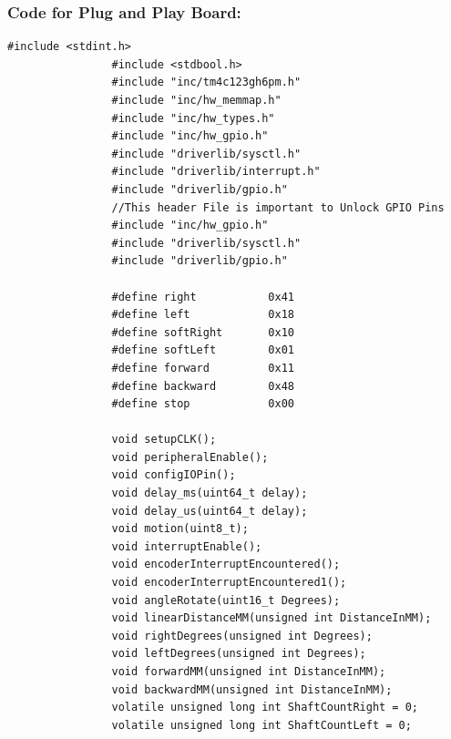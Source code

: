 \documentclass[a4paper,10pt,oneside]{article}
\begin{document}
			\subsubsection{\textbf{Code for Plug and Play Board:}}
			\begin{lstlisting}[style=CStyle]
				#include <stdint.h>
				#include <stdbool.h>
				#include "inc/tm4c123gh6pm.h"
				#include "inc/hw_memmap.h"
				#include "inc/hw_types.h"
				#include "inc/hw_gpio.h"
				#include "driverlib/sysctl.h"
				#include "driverlib/interrupt.h"
				#include "driverlib/gpio.h"
				//This header File is important to Unlock GPIO Pins
				#include "inc/hw_gpio.h"
				#include "driverlib/sysctl.h"
				#include "driverlib/gpio.h"
				
				#define right           0x41
				#define left            0x18
				#define softRight       0x10
				#define softLeft        0x01
				#define forward         0x11
				#define backward        0x48
				#define stop            0x00
				
				void setupCLK();
				void peripheralEnable();
				void configIOPin();
				void delay_ms(uint64_t delay);
				void delay_us(uint64_t delay);
				void motion(uint8_t);
				void interruptEnable();
				void encoderInterruptEncountered();
				void encoderInterruptEncountered1();
				void angleRotate(uint16_t Degrees);
				void linearDistanceMM(unsigned int DistanceInMM);
				void rightDegrees(unsigned int Degrees);
				void leftDegrees(unsigned int Degrees);
				void forwardMM(unsigned int DistanceInMM);
				void backwardMM(unsigned int DistanceInMM);
				volatile unsigned long int ShaftCountRight = 0;
				volatile unsigned long int ShaftCountLeft = 0;
				

\end{lstlisting}
\end{document}
